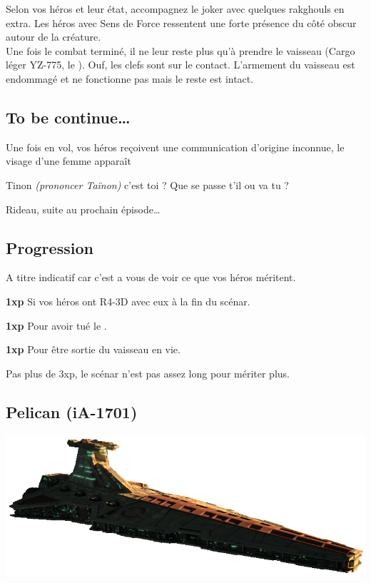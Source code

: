 Selon vos héros et leur état, accompagnez le joker avec quelques rakghouls en extra. Les héros avec Sens de Force ressentent une forte présence du côté obscur autour de la créature.\\

Une fois le combat terminé, il ne leur reste plus qu’à prendre le vaisseau (Cargo léger YZ-775, le ). Ouf, les clefs sont sur le contact. L’armement du vaisseau est endommagé et ne fonctionne pas mais le reste est intact.

\subsection{To be continue\ldots}
Une fois en vol, vos héros reçoivent une communication d’origine inconnue, le visage d’une femme apparaît

\begin{quotebox}
	Tinon \emph{(prononcer Taïnon)} c’est toi ? Que se passe t’il ou va tu ?
\end{quotebox}

Rideau, suite au prochain épisode\ldots

\subsection{Progression}
A titre indicatif car c’est a vous de voir ce que vos héros méritent.

\begin{rebelist}
	\item \textbf{1xp} Si vos héros ont R4-3D avec eux à la fin du scénar.
	\item \textbf{1xp} Pour avoir tué le .
	\item \textbf{1xp} Pour être sortie du vaisseau en vie.
\end{rebelist}
Pas plus de 3xp, le scénar n’est pas assez long pour mériter plus.

\clearpage
\subsection{Pelican (iA-1701)} \label{sec:pelican}

\includegraphics[width=\textwidth]{_img/venator.png}
\vspace{-4\baselineskip}

